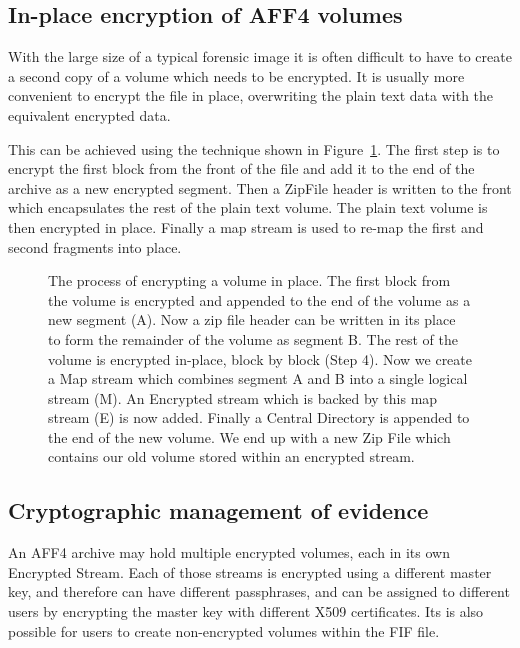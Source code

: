 \documentclass[10pt, conference]{IEEEtran}
\begin{document}
\subsection{In-place encryption of AFF4 volumes}
With the large size of a typical forensic image it is often difficult
to have to create a second copy of a volume which needs to be
encrypted. It is usually more convenient to encrypt the file in place,
overwriting the plain text data with the equivalent encrypted data.

This can be achieved using the technique shown in
Figure~\ref{inplace_crypto}. The first step is to encrypt the first
block from the front of the file and add it to the end of the archive
as a new encrypted segment. Then a ZipFile header is written to the
front which encapsulates the rest of the plain text volume. The plain
text volume is then encrypted in place. Finally a map stream is used
to re-map the first and second fragments into place.

\begin{figure}[tb]
  \begin{center}
  \mbox{\columnwidth {}}

  \caption{The process of encrypting a volume in place. The first
  block from the volume is encrypted and appended to the end of the
  volume as a new segment (A). Now a zip file header can be written in
  its place to form the remainder of the volume as segment B. The rest
  of the volume is encrypted in-place, block by block (Step 4). Now we
  create a Map stream which combines segment A and B into a single
  logical stream (M). An Encrypted stream which is backed by this map
  stream (E) is now added. Finally a Central Directory is appended to
  the end of the new volume. We end up with a new Zip File which
  contains our old volume stored within an encrypted stream.}

  \label{inplace_crypto}
  \end{center}
\end{figure}


\subsection{Cryptographic management of evidence}
An AFF4 archive may hold multiple encrypted volumes, each in its own
Encrypted Stream. Each of those streams is encrypted using a different
master key, and therefore can have different passphrases, and can be
assigned to different users by encrypting the master key with
different X509 certificates. Its is also possible for users to create
non-encrypted volumes within the FIF file.
\end{document}
